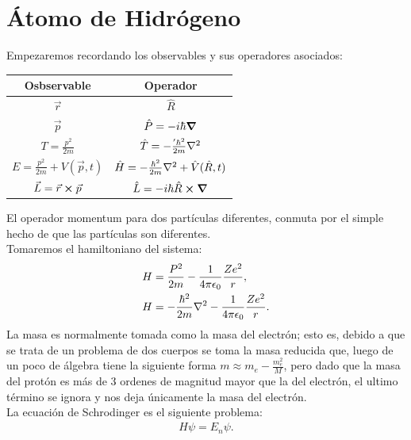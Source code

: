 \section{Átomo de Hidrógeno}
Empezaremos recordando los observables y sus operadores asociados:
\begin{table}[H]
	\centering
	\begin{tabular}{cc}
		\hline
		\hline
		Osbservable & Operador \\
		\hline
		\hline
		$\vec{r}$ & $\hat{R}$ \\
		$\vec{p}$ & $\hat{P} = -i\hbar \gradient$ \\
		$T=\frac{p^2}{2m}$ & $\hat{T} = -\frac{'\hbar ^2}{2m} \laplacian$ \\
		$E=\frac{p^2}{2m} + V(\vec{p} ,t)$ & $\hat{H} = -\frac{\hbar ^2}{2m} \laplacian + \hat{V} (\hat{R},t)$ \\
		$\vec{L} = \vec{r} \cp \vec{p}$ & $\hat{L} = -i\hbar \hat{R}\cp \grad$ \\
		\hline
		\hline
	\end{tabular}
\end{table}

El operador momentum para dos partículas diferentes, conmuta por el simple hecho de que las partículas son diferentes. \\

Tomaremos el hamiltoniano del sistema:
\begin{align}
    H &= \frac{P^2}{2m} - \frac{1}{4\pi \ep} \frac{Ze^2}{r}, \\
    H &= -\frac{\hbar ^2}{2m} \laplacian - \frac{1}{4\pi \ep} \frac{Ze^2}{r}. 
\end{align}
La masa es normalmente tomada como la masa del electrón; esto es, debido a que se trata de un problema de dos cuerpos se toma la masa reducida que, luego de un poco de álgebra tiene la siguiente forma $m \approx m_e - \frac{m_e ^2}{M}$, pero dado que la masa del protón es más de 3 ordenes de magnitud mayor que la del electrón, el ultimo término se ignora y nos deja únicamente la masa del electrón.  \\
La ecuación de Schrodinger es el siguiente problema:
\begin{align*}
    H\psi = E_n \psi .
\end{align*}

